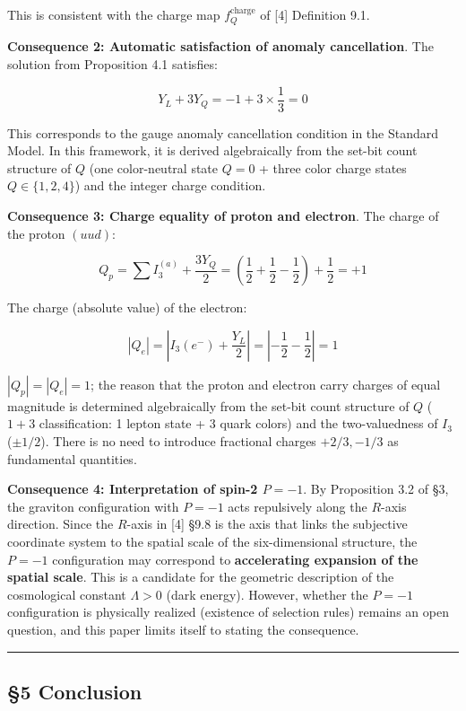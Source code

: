 \documentclass[
  a4paper,11pt]{article}
\begin{document}
This is consistent with the charge map \(f_Q^{\text{charge}}\) of
{[}4{]} Definition 9.1.

\textbf{Consequence 2: Automatic satisfaction of anomaly cancellation}.
The solution from Proposition 4.1 satisfies:

\[Y_L + 3 Y_Q = -1 + 3 \times \frac{1}{3} = 0\]

This corresponds to the gauge anomaly cancellation condition in the
Standard Model. In this framework, it is derived algebraically from the
set-bit count structure of \(Q\) (one color-neutral state \(Q = 0\) +
three color charge states \(Q \in \{1,2,4\}\)) and the integer charge
condition.

\textbf{Consequence 3: Charge equality of proton and electron}. The
charge of the proton \((uud)\):

\[Q_p = \sum I_3^{(a)} + \frac{3 Y_Q}{2} = \left(\frac{1}{2} + \frac{1}{2} - \frac{1}{2}\right) + \frac{1}{2} = +1\]

The charge (absolute value) of the electron:

\[|Q_e| = \left|I_3(e^-) + \frac{Y_L}{2}\right| = \left|-\frac{1}{2} - \frac{1}{2}\right| = 1\]

\(|Q_p| = |Q_e| = 1\); the reason that the proton and electron carry
charges of equal magnitude is determined algebraically from the set-bit
count structure of \(Q\) (\(1 + 3\) classification: 1 lepton state + 3
quark colors) and the two-valuedness of \(I_3\) (\(\pm 1/2\)). There is
no need to introduce fractional charges \(+2/3, -1/3\) as fundamental
quantities.

\textbf{Consequence 4: Interpretation of spin-2 \(P = -1\)}. By
Proposition 3.2 of §3, the graviton configuration with \(P = -1\) acts
repulsively along the \(R\)-axis direction. Since the \(R\)-axis in
{[}4{]} §9.8 is the axis that links the subjective coordinate system to
the spatial scale of the six-dimensional structure, the \(P = -1\)
configuration may correspond to \textbf{accelerating expansion of the
spatial scale}. This is a candidate for the geometric description of the
cosmological constant \(\Lambda > 0\) (dark energy). However, whether
the \(P = -1\) configuration is physically realized (existence of
selection rules) remains an open question, and this paper limits itself
to stating the consequence.

\begin{center}\rule{0.5\linewidth}{0.5pt}\end{center}

\subsection{§5 Conclusion}\label{conclusion}
\end{document}
